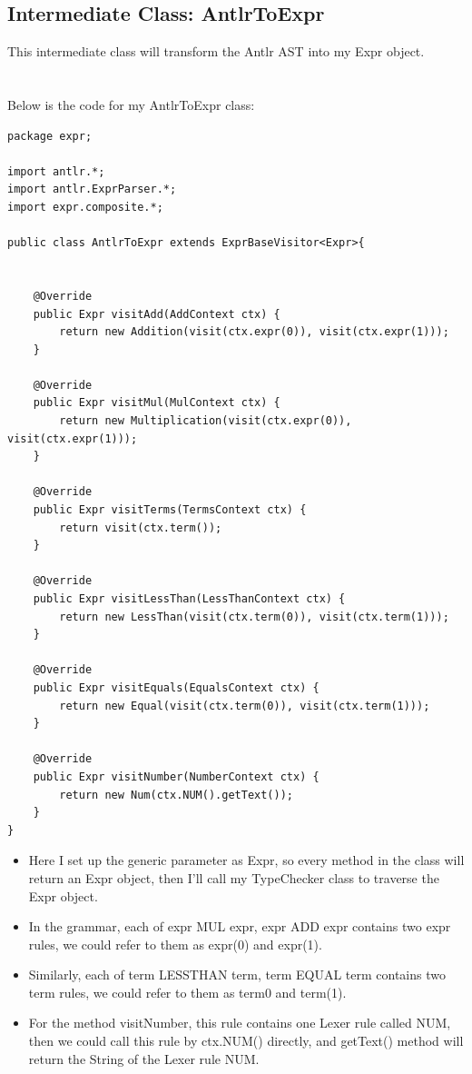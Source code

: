 \documentclass[a4paper,12pt,titlepage]{article}
\begin{document}

\subsection{Intermediate Class: AntlrToExpr}
This intermediate class will transform the Antlr AST into my Expr object.
\\
\\
\\
Below is the code for my  {\footnotesize\ttfamily AntlrToExpr} class:
\begin{lstlisting}
package expr;

import antlr.*;
import antlr.ExprParser.*;
import expr.composite.*;

public class AntlrToExpr extends ExprBaseVisitor<Expr>{
	
	
	@Override
	public Expr visitAdd(AddContext ctx) {
		return new Addition(visit(ctx.expr(0)), visit(ctx.expr(1))); 
	}
	
	@Override
	public Expr visitMul(MulContext ctx) {
		return new Multiplication(visit(ctx.expr(0)), visit(ctx.expr(1))); 
	}
	
	@Override
	public Expr visitTerms(TermsContext ctx) {
		return visit(ctx.term());
	}
	
	@Override
	public Expr visitLessThan(LessThanContext ctx) {
		return new LessThan(visit(ctx.term(0)), visit(ctx.term(1))); 
	}
	
	@Override
	public Expr visitEquals(EqualsContext ctx) {
		return new Equal(visit(ctx.term(0)), visit(ctx.term(1))); 
	}
	
	@Override
	public Expr visitNumber(NumberContext ctx) {
		return new Num(ctx.NUM().getText());
	}
}
\end{lstlisting}

\begin{itemize}
	\item Here I set up the generic parameter as {\footnotesize\ttfamily Expr}, so every method in the class will return an Expr object, then I'll call my {\footnotesize\ttfamily TypeChecker} class to traverse the Expr object.
  	\item In the grammar, each of {\footnotesize\ttfamily expr MUL expr, expr ADD expr} contains two {\footnotesize\ttfamily expr} rules, we could refer to them as {\footnotesize\ttfamily expr(0)} and {\footnotesize\ttfamily expr(1)}.
	\item Similarly, each of {\footnotesize\ttfamily term LESSTHAN term, term EQUAL term} contains two {\footnotesize\ttfamily term} rules, we could refer to them as {\footnotesize\ttfamily term0} and {\footnotesize\ttfamily term(1)}.
	\item For the method {\footnotesize\ttfamily visitNumber}, this rule contains one Lexer rule called {\footnotesize\ttfamily NUM}, then we could call this rule by {\footnotesize\ttfamily ctx.NUM()} directly, and {\footnotesize\ttfamily getText()} method will return the String of the Lexer rule NUM.
\end{itemize}
~\\
\end{document}
